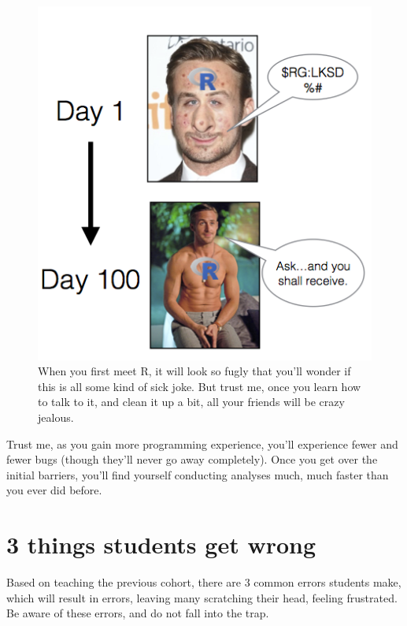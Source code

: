 \documentclass[
]{book}
\begin{document}
\begin{figure}

{\centering \includegraphics[width=5.99in]{images/index/gosling} 

}

\caption{When you first meet R, it will look so fugly that you'll wonder if this is all some kind of sick joke. But trust me, once you learn how to talk to it, and clean it up a bit, all your friends will be crazy jealous.}\label{fig:gosling}
\end{figure}

Trust me, as you gain more programming experience, you'll experience fewer and fewer bugs (though they'll never go away completely). Once you get over the initial barriers, you'll find yourself conducting analyses much, much faster than you ever did before.

\hypertarget{things-students-get-wrong}{%
\section{3 things students get wrong}\label{things-students-get-wrong}}

Based on teaching the previous cohort, there are 3 common errors students make, which will result in errors, leaving many scratching their head, feeling frustrated. Be aware of these errors, and do not fall into the trap.
\end{document}
